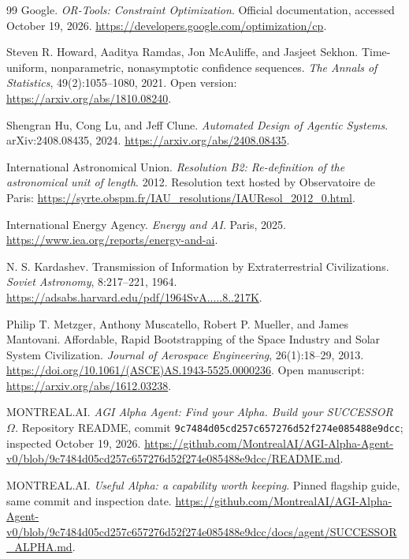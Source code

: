 \documentclass[11pt,letterpaper]{article}
\newcommand{\1}{\mathbf 1}
\theoremstyle{remark}\newtheorem{remark}{Remark}[section]
\begin{document}
\begin{thebibliography}{99}
Google. \emph{OR-Tools: Constraint Optimization}. Official documentation, accessed October 19, 2026. \url{https://developers.google.com/optimization/cp}.

Steven R. Howard, Aaditya Ramdas, Jon McAuliffe, and Jasjeet Sekhon. Time-uniform, nonparametric, nonasymptotic confidence sequences. \emph{The Annals of Statistics}, 49(2):1055--1080, 2021. Open version: \url{https://arxiv.org/abs/1810.08240}.

Shengran Hu, Cong Lu, and Jeff Clune. \emph{Automated Design of Agentic Systems}. arXiv:2408.08435, 2024. \url{https://arxiv.org/abs/2408.08435}.

International Astronomical Union. \emph{Resolution B2: Re-definition of the astronomical unit of length}. 2012. Resolution text hosted by Observatoire de Paris: \url{https://syrte.obspm.fr/IAU_resolutions/IAUResol_2012_0.html}.

International Energy Agency. \emph{Energy and AI}. Paris, 2025. \url{https://www.iea.org/reports/energy-and-ai}.

N. S. Kardashev. Transmission of Information by Extraterrestrial Civilizations. \emph{Soviet Astronomy}, 8:217--221, 1964. \url{https://adsabs.harvard.edu/pdf/1964SvA.....8..217K}.

Philip T. Metzger, Anthony Muscatello, Robert P. Mueller, and James Mantovani. Affordable, Rapid Bootstrapping of the Space Industry and Solar System Civilization. \emph{Journal of Aerospace Engineering}, 26(1):18--29, 2013. \url{https://doi.org/10.1061/(ASCE)AS.1943-5525.0000236}. Open manuscript: \url{https://arxiv.org/abs/1612.03238}.

MONTREAL.AI. \emph{AGI Alpha Agent: Find your Alpha. Build your SUCCESSOR $\Omega$.} Repository README, commit \texttt{9c7484d05cd257c657276d52f274e085488e9dcc}; inspected October 19, 2026. \url{https://github.com/MontrealAI/AGI-Alpha-Agent-v0/blob/9c7484d05cd257c657276d52f274e085488e9dcc/README.md}.

MONTREAL.AI. \emph{Useful Alpha: a capability worth keeping}. Pinned flagship guide, same commit and inspection date. \url{https://github.com/MontrealAI/AGI-Alpha-Agent-v0/blob/9c7484d05cd257c657276d52f274e085488e9dcc/docs/agent/SUCCESSOR_ALPHA.md}.


\end{thebibliography}
\end{document}
